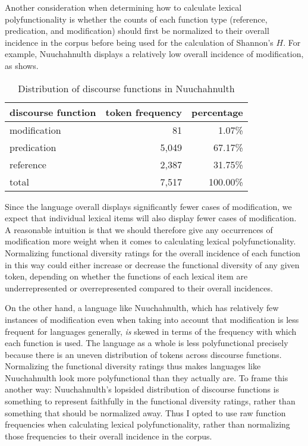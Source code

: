 Another consideration when determining how to calculate lexical polyfunctionality is whether the counts of each function type (reference, predication, and modification) should first be normalized to their overall incidence in the corpus before being used for the calculation of Shannon's $H$. For example, Nuuchahnulth displays a relatively low overall incidence of modification, as  shows.

\begin{table}[h]
  \centering
  \caption{Distribution of discourse functions in Nuuchahnulth}
  \label{tab:Nuuchahnulth-function-proportions}
  \begin{tabular}{ l r r }
    \toprule
    discourse function & token frequency & percentage\\
    \midrule
    modification &    81 &   1.07\%\\
    predication  & 5,049 &  67.17\%\\
    reference    & 2,387 &  31.75\%\\
    \midrule
    total        & 7,517 & 100.00\%\\
    \bottomrule
  \end{tabular}
\end{table}

\noindent Since the language overall displays significantly fewer cases of modification, we expect that individual lexical items will also display fewer cases of modification.  A reasonable intuition is that we should therefore give any occurrences of modification more weight when it comes to calculating lexical polyfunctionality. Normalizing functional diversity ratings for the overall incidence of each function in this way could either increase or decrease the functional diversity of any given token, depending on whether the functions of each lexical item are underrepresented or overrepresented compared to their overall incidences.

On the other hand, a language like Nuuchahnulth, which has relatively few instances of modification even when taking into account that modification is less frequent for languages generally, \emph{is} skewed in terms of the frequency with which each function is used. The language as a whole is less polyfunctional precisely because there is an uneven distribution of tokens across discourse functions. Normalizing the functional diversity ratings thus makes languages like Nuuchahnulth look more polyfunctional than they actually are. To frame this another way: Nuuchahnulth's lopsided distribution of discourse functions is something to represent faithfully in the functional diversity ratings, rather than something that should be normalized away. Thus I opted to use raw function frequencies when calculating lexical polyfunctionality, rather than normalizing those frequencies to their overall incidence in the corpus.

